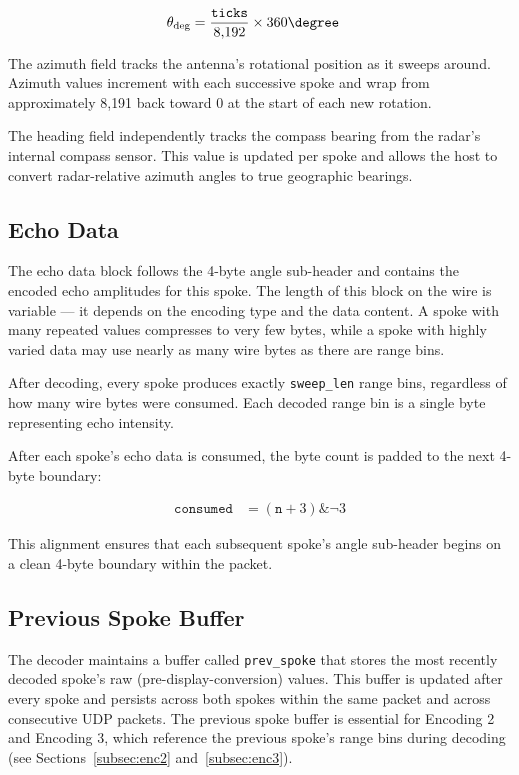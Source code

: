 \documentclass[11pt,letterpaper]{article}
\begin{document}
\begin{align}
\theta_{\text{deg}} &= \frac{\texttt{ticks}}{8{,}192} \times 360\degree
\end{align}

The azimuth field tracks the antenna's rotational position as it sweeps around. Azimuth values increment with each successive spoke and wrap from approximately 8{,}191 back toward 0 at the start of each new rotation.

The heading field independently tracks the compass bearing from the radar's internal compass sensor. This value is updated per spoke and allows the host to convert radar-relative azimuth angles to true geographic bearings.

\subsection{Echo Data}

The echo data block follows the 4-byte angle sub-header and contains the encoded echo amplitudes for this spoke. The length of this block on the wire is variable --- it depends on the encoding type and the data content. A spoke with many repeated values compresses to very few bytes, while a spoke with highly varied data may use nearly as many wire bytes as there are range bins.

After decoding, every spoke produces exactly \texttt{sweep\_len} range bins, regardless of how many wire bytes were consumed. Each decoded range bin is a single byte representing echo intensity.

After each spoke's echo data is consumed, the byte count is padded to the next 4-byte boundary:

\begin{align}
\texttt{consumed} &= (\texttt{n} + 3) \mathbin{\&} \lnot 3
\end{align}

This alignment ensures that each subsequent spoke's angle sub-header begins on a clean 4-byte boundary within the packet.

\subsection{Previous Spoke Buffer}

The decoder maintains a buffer called \texttt{prev\_spoke} that stores the most recently decoded spoke's raw (pre-display-conversion) values. This buffer is updated after every spoke and persists across both spokes within the same packet and across consecutive UDP packets. The previous spoke buffer is essential for Encoding 2 and Encoding 3, which reference the previous spoke's range bins during decoding (see Sections~\ref{subsec:enc2} and~\ref{subsec:enc3}).
\end{document}
